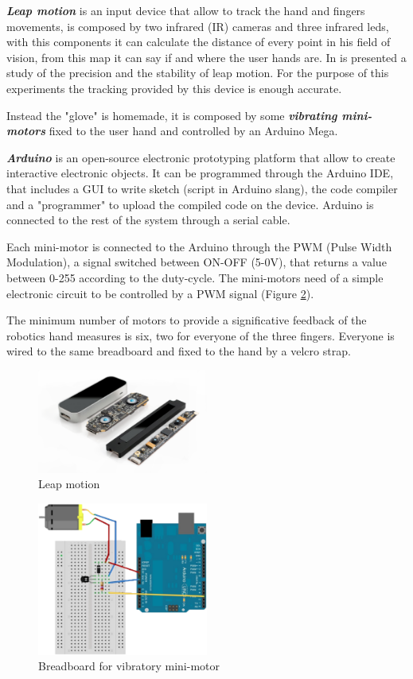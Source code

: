 \textbf{\textit{Leap motion}} is an input device that allow to track the hand and fingers movements, is composed by two infrared (IR) cameras and three infrared leds, with this components it can calculate the distance of every point in his field of vision, from this map it can say if and where the user hands are. 
In \cite{weichert2013analysis} is presented a study of the precision and the stability of leap motion. For the purpose of this experiments the tracking provided by this device is enough accurate.

Instead the "glove" is homemade, it is composed by some \textbf{\textit{vibrating mini-motors}} fixed to the user hand and controlled by an Arduino Mega.

\textbf{\textit{Arduino}} is an open-source electronic prototyping platform that allow to create interactive electronic objects. It can be programmed through the Arduino IDE, that includes a GUI to write sketch (script in Arduino slang), the code compiler and a "programmer" to upload the compiled code on the device. Arduino is connected to the rest of the system through a serial cable.

Each mini-motor is connected to the Arduino through the PWM (Pulse Width Modulation), a signal switched between ON-OFF (5-0V), that returns a value between 0-255 according to the duty-cycle.
The mini-motors need of a simple electronic circuit to be controlled by a PWM signal (Figure \ref{fig:breadboard}).

The minimum number of motors to provide a significative feedback of the robotics hand measures is six, two for everyone of the three fingers. Everyone is wired to the same breadboard and fixed to the hand by a velcro strap.


\begin{figure}
  \centering
    \includegraphics[width=0.5\textwidth]{img/leap_motion.eps}
  \caption{Leap motion}
  \label{fig:leap_motion}
\end{figure}

\begin{figure}
  \centering
    \includegraphics[width=0.5\textwidth]{img/breadboard.eps}
  \caption{Breadboard for vibratory mini-motor}
  \label{fig:breadboard}
\end{figure}

